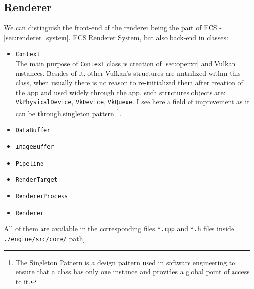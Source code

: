 \newpage
\subsection{Renderer}
\label{sec:renderer}
We can distinguish the front-end of the renderer being the part of ECS - \hyperref[sec:renderer_system]{\ref*{sec:renderer_system}. ECS Renderer System}, but also back-end in classes:
\begin{itemize}
    \item \texttt{Context}\\
    The main purpose of \texttt{Context} class is creation of \hyperref[sec:openxr]{\ref*{sec:openxr}} and Vulkan instances. Besides of it, other Vulkan's structures are initialized within this class, when usually there is no reason to re-initialized them after creation of the app and used widely through the app, such structures objects are: \texttt{VkPhysicalDevice}, \texttt{VkDevice}, \texttt{VkQueue}. I see here a field of improvement as it can be through singleton pattern \footnote{The Singleton Pattern is a design pattern used in software engineering to ensure that a class has only one instance and provides a global point of access to it.}.
    \item \texttt{DataBuffer}
    \item \texttt{ImageBuffer}
    \item \texttt{Pipeline}
    \item \texttt{RenderTarget}
    \item \texttt{RendererProcess}
    \item \texttt{Renderer}
\end{itemize}
All of them are available in the corresponding files \texttt{*.cpp} and \texttt{*.h} files inside \texttt{./engine/src/core/} path]